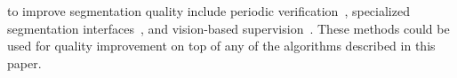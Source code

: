  to improve segmentation quality include periodic verification~\cite{Lin2014,Everingham15}, specialized segmentation interfaces~\cite{Song2018}, and vision-based supervision~\cite{Russakovsky2015,Gurari2016}. These methods could be used for quality improvement on top of any of the algorithms described in this paper.  %

